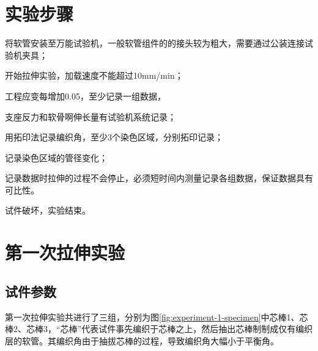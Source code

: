 \section{实验步骤}

\begin{compactenum}
	\item 将软管安装至万能试验机，一般软管组件的的接头较为粗大，需要通过公装连接试验机夹具；
	\item 开始拉伸实验，加载速度不能超过10mm/min；
	\item 工程应变每增加0.05，至少记录一组数据，
	\begin{compactitem}
		\item 支座反力和软骨啊伸长量有试验机系统记录；
		\item 用拓印法记录编织角，至少3个染色区域，分别拓印记录；
		\item 记录染色区域的管径变化；
		\item 记录数据时拉伸的过程不会停止，必须短时间内测量记录各组数据，保证数据具有可比性。
	\end{compactitem}
	\item 试件破坏，实验结束。
\end{compactenum}





\section{第一次拉伸实验}
\subsection{试件参数}
第一次拉伸实验共进行了三组，分别为图\ref{fig:experiment-1-specimen}中芯棒1、芯棒2、芯棒3，“芯棒”代表试件事先编织于芯棒之上，然后抽出芯棒制制成仅有编织层的软管。其编织角由于抽拔芯棒的过程，导致编织角大幅小于平衡角。



